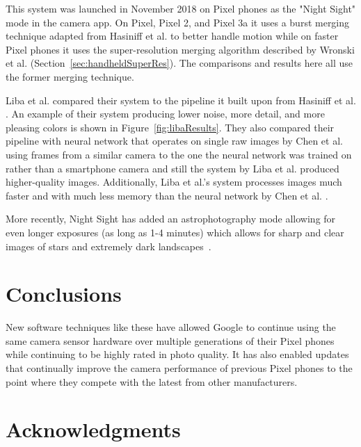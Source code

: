 \documentclass{sig-alternate}
\begin{document}
This system was launched in November 2018 on Pixel phones as the "Night Sight" mode in the camera app. On Pixel, Pixel 2, and Pixel 3a it uses a burst merging technique adapted from Hasiniff et al. \cite{Hasinoff2016} to better handle motion while on faster Pixel phones it uses the super-resolution merging algorithm described by Wronski et al. \cite{Wronski2019} (Section~\ref{sec:handheldSuperRes}). The comparisons and results here all use the former merging technique. \cite{Liba2019}

Liba et al. compared their system to the pipeline it built upon from Hasiniff et al. \cite{Hasinoff2016}. An example of their system producing lower noise, more detail, and more pleasing colors is shown in Figure~\ref{fig:libaResults}. They also compared their pipeline with neural network that operates on single raw images by Chen et al.~\cite{Chen2018} using frames from a similar camera to the one the neural network was trained on rather than a smartphone camera and still the system by Liba et al. produced higher-quality images. Additionally, Liba et al.'s system processes images much faster and with much less memory than the neural network by Chen et al. \cite{Chen2018}.~\cite{Liba2019}


More recently, Night Sight has added an astrophotography mode allowing for even longer exposures (as long as 1-4 minutes) which allows for sharp and clear images of stars and extremely dark landscapes~\cite{blog:Kainz2019}.




\section{Conclusions}

New software techniques like these have allowed Google to continue using the same camera sensor hardware over multiple generations of their Pixel phones while continuing to be highly rated in photo quality. It has also enabled updates that continually improve the camera performance of previous Pixel phones to the point where they compete with the latest from other manufacturers.


\section*{Acknowledgments}
\label{sec:acknowledgments}



  
\end{document}
